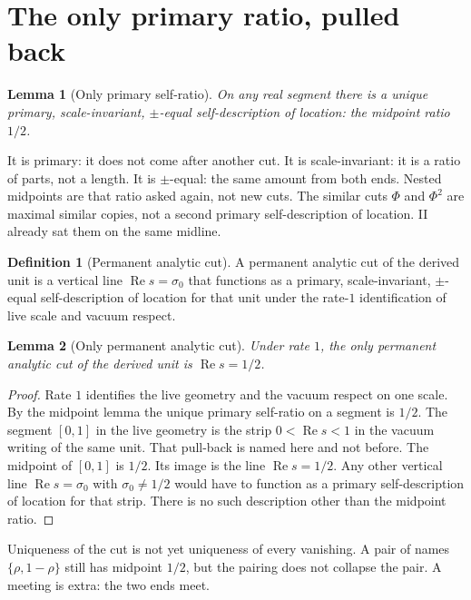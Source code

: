 \documentclass[10pt,a4paper]{article}
\theoremstyle{plain}
\newtheorem{lemma}{Lemma}
\theoremstyle{definition}
\newtheorem{definition}{Definition}
\theoremstyle{remark}
\begin{document}
\section{The only primary ratio, pulled back}

\begin{lemma}[Only primary self-ratio]
On any real segment there is a unique primary, scale-invariant, $\pm$-equal self-description of location: the midpoint ratio $1/2$.
\end{lemma}

It is primary: it does not come after another cut.
It is scale-invariant: it is a ratio of parts, not a length.
It is $\pm$-equal: the same amount from both ends.
Nested midpoints are that ratio asked again, not new cuts.
The similar cuts $\Phi$ and $\Phi^{2}$ are maximal similar copies, not a second primary self-description of location.
II already sat them on the same midline.

\begin{definition}[Permanent analytic cut]
A permanent analytic cut of the derived unit is a vertical line $\operatorname{Re}s=\sigma_0$ that functions as a primary, scale-invariant, $\pm$-equal self-description of location for that unit under the rate-$1$ identification of live scale and vacuum respect.
\end{definition}

\begin{lemma}[Only permanent analytic cut]
Under rate $1$, the only permanent analytic cut of the derived unit is $\operatorname{Re}s=1/2$.
\end{lemma}

\begin{proof}
Rate $1$ identifies the live geometry and the vacuum respect on one scale.
By the midpoint lemma the unique primary self-ratio on a segment is $1/2$.
The segment $[0,1]$ in the live geometry is the strip $0<\operatorname{Re}s<1$ in the vacuum writing of the same unit.
That pull-back is named here and not before.
The midpoint of $[0,1]$ is $1/2$.
Its image is the line $\operatorname{Re}s=1/2$.
Any other vertical line $\operatorname{Re}s=\sigma_0$ with $\sigma_0\neq 1/2$ would have to function as a primary self-description of location for that strip.
There is no such description other than the midpoint ratio.
\end{proof}

Uniqueness of the cut is not yet uniqueness of every vanishing.
A pair of names $\{\rho,1-\rho\}$ still has midpoint $1/2$, but the pairing does not collapse the pair.
A meeting is extra: the two ends meet.
\end{document}
